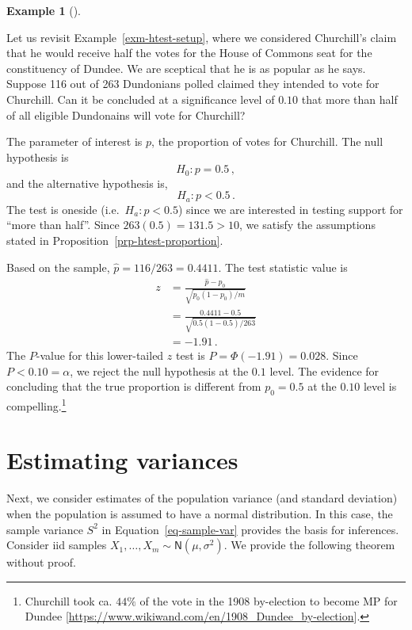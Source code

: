 \documentclass[
  a4paper,
  DIV=11,
  numbers=noendperiod,
  oneside]{scrreprt}
\theoremstyle{plain}
\theoremstyle{definition}
\theoremstyle{definition}
\newtheorem{example}{Example}[chapter]
\theoremstyle{definition}
\theoremstyle{plain}
\theoremstyle{remark}
\begin{document}
\begin{example}[]\protect\hypertarget{exm-est-prop-hypothesis-test}{}\label{exm-est-prop-hypothesis-test}

Let us revisit Example~\ref{exm-htest-setup}, where we considered
Churchill's claim that he would receive half the votes for the House of
Commons seat for the constituency of Dundee. We are sceptical that he is
as popular as he says. Suppose 116 out of 263 Dundonians polled claimed
they intended to vote for Churchill. Can it be concluded at a
significance level of \(0.10\) that more than half of all eligible
Dundonains will vote for Churchill?

The parameter of interest is \(p\), the proportion of votes for
Churchill. The null hypothesis is \[H_0 : p = 0.5\,,\] and the
alternative hypothesis is, \[H_a : p < 0.5\,.\] The test is oneside
(i.e.~\(H_a : p < 0.5\)) since we are interested in testing support for
``more than half''. Since \(263(0.5) = 131.5 > 10\), we satisfy the
assumptions stated in Proposition~\ref{prp-htest-proportion}.

Based on the sample, \(\widehat{p} = 116 / 263 = 0.4411.\) The test
statistic value is \[
\begin{aligned}
 z &= \frac{\widehat{p} - p_0}{\sqrt{p_0 (1-p_0) / m}} \\
 &= \frac{0.4411 - 0.5}{\sqrt{0.5 (1-0.5) / 263}}\\
 &= -1.91  \,.
\end{aligned}
\] The \(P\)-value for this lower-tailed \(z\) test is
\(P = \Phi(-1.91) = 0.028.\) Since \(P < 0.10 = \alpha\), we reject the
null hypothesis at the \(0.1\) level. The evidence for concluding that
the true proportion is different from \(p_0 = 0.5\) at the \(0.10\)
level is compelling.\footnote{Churchill took ca. \(44\%\) of the vote in
  the 1908 by-election to become MP for Dundee
  {[}\url{https://www.wikiwand.com/en/1908_Dundee_by-election}{]}.}

\end{example}

\section{Estimating variances}\label{sec-estimating-variances}

Next, we consider estimates of the population variance (and standard
deviation) when the population is assumed to have a normal distribution.
In this case, the sample variance \(S^2\) in
Equation~\ref{eq-sample-var} provides the basis for inferences. Consider
iid samples \(X_1, \dots, X_m \sim \mathsf{N}(\mu, \sigma^2).\) We
provide the following theorem without proof.
\end{document}
